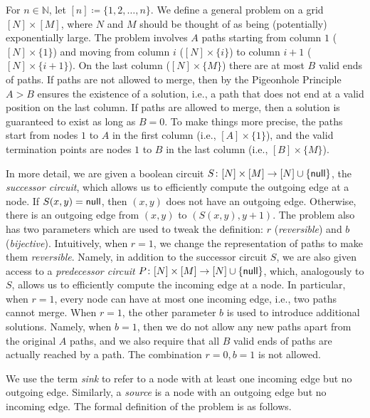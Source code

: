 \documentclass[10pt,a4paper]{article}
\theoremstyle{definition}
\theoremstyle{plain}
\theoremstyle{remark}
\newcommand{\nul}{\textup{\textsf{null}}}
\begin{document}
For $n \in \mathbb{N}$, let $[n] \coloneqq \{1,2,\dots,n\}$. We define a general problem on a grid $[N] \times [M]$, where $N$ and $M$ should be thought of as being (potentially) exponentially large. The problem involves $A$ paths starting from column $1$ ($[N] \times \{1\}$) and moving from column $i$ ($[N] \times \{i\}$) to column $i+1$ ($[N] \times \{i+1\}$). On the last column ($[N] \times \{M\}$) there are at most $B$ valid ends of paths. If paths are not allowed to merge, then by the Pigeonhole Principle $A > B$ ensures the existence of a solution, i.e., a path that does not end at a valid position on the last column. If paths are allowed to merge, then a solution is guaranteed to exist as long as $B = 0$. To make things more precise, the paths start from nodes $1$ to $A$ in the first column (i.e., $[A] \times \{1\}$), and the valid termination points are nodes $1$ to $B$ in the last column (i.e., $[B] \times \{M\}$).

In more detail, we are given a boolean circuit $S\colon [N] \times [M] \to [N] \cup \{\nul\}$, the \emph{successor circuit}, which allows us to efficiently compute the outgoing edge at a node. If $S(x,y) = \nul$, then $(x,y)$ does not have an outgoing edge. Otherwise, there is an outgoing edge from $(x,y)$ to $(S(x,y),y+1)$. The problem also has two parameters which are used to tweak the definition: $r$ (\emph{reversible}) and $b$ (\emph{bijective}). Intuitively, when $r=1$, we change the representation of paths to make them \emph{reversible}. Namely, in addition to the successor circuit $S$, we are also given access to a \emph{predecessor circuit} $P \colon [N] \times [M] \to [N] \cup \{\nul\}$, which, analogously to $S$, allows us to efficiently compute the incoming edge at a node. In particular, when $r=1$, every node can have at most one incoming edge, i.e., two paths cannot merge. When $r=1$, the other parameter $b$ is used to introduce additional solutions. Namely, when $b=1$, then we do not allow any new paths apart from the original $A$ paths, and we also require that all $B$ valid ends of paths are actually reached by a path. The combination $r=0, b=1$ is not allowed.

We use the term \emph{sink} to refer to a node with at least one incoming edge but no outgoing edge. Similarly, a \emph{source} is a node with an outgoing edge but no incoming edge. The formal definition of the problem is as follows.
\end{document}
